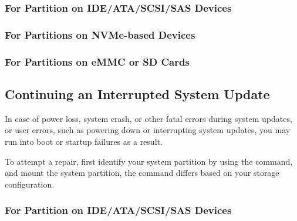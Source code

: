 \documentclass[a5paper,twosided,11pt]{book}
\begin{document}
    \subsubsection*{For Partition on IDE/ATA/SCSI/SAS Devices}


    \subsubsection*{For Partitions on NVMe-based Devices}


    \subsubsection*{For Partitions on eMMC or SD Cards}





    \subsection{Continuing an Interrupted System Update}

    In case of power loss, system crash, or other fatal errors during system updates,
    or user errors, such as powering down or interrupting system updates,
    you may run into boot or startup failures as a result.

    To attempt a repair, first identify your system partition by using the  command,
    and mount the system partition, the command differs based on your storage configuration.

    \subsubsection*{For Partition on IDE/ATA/SCSI/SAS Devices}

\end{document}
